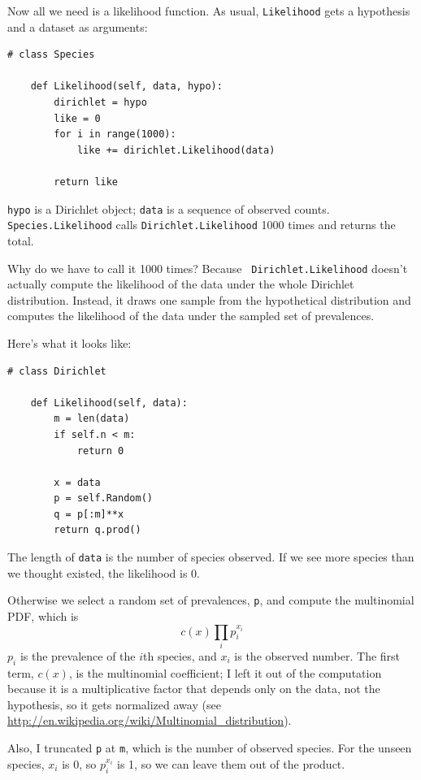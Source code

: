 \documentclass[12pt]{book}
\begin{document}
Now all we need is a likelihood function.  As usual,
{\tt Likelihood} gets a hypothesis and a dataset as arguments:

\begin{verbatim}
# class Species

    def Likelihood(self, data, hypo):
        dirichlet = hypo
        like = 0
        for i in range(1000):
            like += dirichlet.Likelihood(data)

        return like
\end{verbatim}

{\tt hypo} is a Dirichlet object; {\tt data} is a sequence of
observed counts.  {\tt Species.Likelihood} calls
{\tt Dirichlet.Likelihood} 1000 times and returns the total.

Why do we have to call it 1000 times?  Because {\tt
  Dirichlet.Likelihood} doesn't actually compute the likelihood of the
data under the whole Dirichlet distribution.  Instead, it draws one
sample from the hypothetical distribution and computes the likelihood
of the data under the sampled set of prevalences.

Here's what it looks like:

\begin{verbatim}
# class Dirichlet

    def Likelihood(self, data):
        m = len(data)
        if self.n < m:
            return 0

        x = data
        p = self.Random()
        q = p[:m]**x
        return q.prod()
\end{verbatim}

The length of {\tt data} is the number of species observed.  If
we see more species than we thought existed, the likelihood is 0.

Otherwise we select a random set of prevalences, {\tt p}, and
compute the multinomial PDF, which is
%
\[ c(x) \prod_i p_i^{x_i}\]
%
$p_i$ is the prevalence of the $i$th species, and $x_i$ is the
observed number.  The first term, $c(x)$, is the multinomial
coefficient; I left it out of the computation because it is
a multiplicative factor that depends only
on the data, not the hypothesis, so it gets normalized away
(see \url{http://en.wikipedia.org/wiki/Multinomial_distribution}).

Also, I truncated {\tt p} at {\tt m}, which is the number of
observed species.  For the unseen species, $x_i$ is 0, so
$p_i^{x_i}$ is 1, so we can leave them out of the product.
\end{document}
